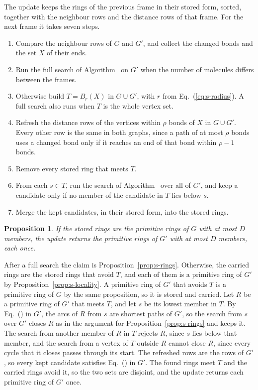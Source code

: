 \documentclass[preprint,12pt]{elsarticle}
\newtheorem{proposition}{Proposition}
\begin{document}
The update keeps the rings of the previous frame in their stored form,
sorted, together with the neighbour rows and the distance rows of that
frame.
For the next frame it takes seven steps.
\begin{enumerate}
\item Compare the neighbour rows of $G$ and $G'$, and collect the
      changed bonds and the set $X$ of their ends.
\item Run the full search of Algorithm~ on $G'$ when the
      number of molecules differs between the frames.
\item Otherwise build $T=B_r(X)$ in $G\cup G'$, with $r$ from
      Eq.~(\ref{eq:s-radius}).
      A full search also runs when $T$ is the whole vertex set.
\item Refresh the distance rows of the vertices within $\rho$ bonds of
      $X$ in $G\cup G'$.
      Every other row is the same in both graphs, since a path of at
      most $\rho$ bonds uses a changed bond only if it reaches an end of
      that bond within $\rho-1$ bonds.
\item Remove every stored ring that meets $T$.
\item From each $s\in T$, run the search of Algorithm~
      over all of $G'$, and keep a candidate only if no member of the
      candidate in $T$ lies below $s$.
\item Merge the kept candidates, in their stored form, into the stored
      rings.
\end{enumerate}

\begin{proposition}
\label{prop:s-update} If the stored rings are the primitive rings of $G$
with at most $D$ members, the update returns the primitive rings of $G'$
with at most $D$ members, each once.
\end{proposition}

\begin{pf}
After a full search the claim is Proposition~\ref{prop:s-rings}.
Otherwise, the carried rings are the stored rings that avoid $T$, and
each of them is a primitive ring of $G'$ by
Proposition~\ref{prop:s-locality}.
A primitive ring of $G'$ that avoids $T$ is a primitive ring of $G$ by
the same proposition, so it is stored and carried.
Let $R$ be a primitive ring of $G'$ that meets $T$, and let $s$ be its
lowest member in $T$.
By Eq.~() in $G'$, the arcs of $R$ from $s$ are
shortest paths of $G'$, so the search from $s$ over $G'$ closes $R$ as
in the argument for Proposition~\ref{prop:s-rings} and keeps it.
The search from another member of $R$ in $T$ rejects $R$, since $s$ lies
below that member, and the search from a vertex of $T$ outside $R$
cannot close $R$, since every cycle that it closes passes through its
start.
The refreshed rows are the rows of $G'$, so every kept candidate
satisfies Eq.~() in $G'$.
The found rings meet $T$ and the carried rings avoid it, so the two sets
are disjoint, and the update returns each primitive ring of $G'$ once.
\end{pf}
\end{document}
